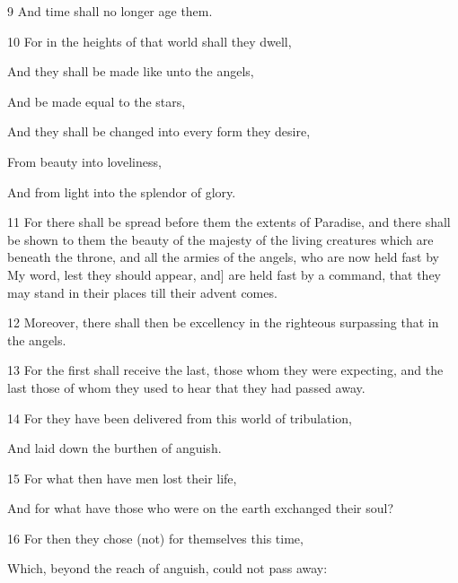 \par 9 And time shall no longer age them.

\par 10 For in the heights of that world shall they dwell,

\par And they shall be made like unto the angels,

\par And be made equal to the stars,

\par And they shall be changed into every form they desire,

\par From beauty into loveliness,

\par And from light into the splendor of glory.

\par 11 For there shall be spread before them the extents of Paradise, and there shall be shown to them the beauty of the majesty of the living creatures which are beneath the throne, and all the armies of the angels, who are now held fast by My word, lest they should appear, and] are held fast by a command, that they may stand in their places till their advent comes. 

\par 12 Moreover, there shall then be excellency in the righteous surpassing that in the angels. 

\par 13 For the first shall receive the last, those whom they were expecting, and the last those of whom they used to hear that they had passed away.

\par 14 For they have been delivered from this world of tribulation,

\par And laid down the burthen of anguish.

\par 15 For what then have men lost their life,

\par And for what have those who were on the earth exchanged their soul?

\par 16 For then they chose (not) for themselves this time,

\par Which, beyond the reach of anguish, could not pass away:

